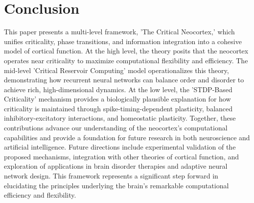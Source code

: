 \documentclass{article}
\begin{document}
\section{Conclusion}
This paper presents a multi-level framework, 'The Critical Neocortex,' which unifies criticality, phase transitions, and information integration into a cohesive model of cortical function. At the high level, the theory posits that the neocortex operates near criticality to maximize computational flexibility and efficiency. The mid-level 'Critical Reservoir Computing' model operationalizes this theory, demonstrating how recurrent neural networks can balance order and disorder to achieve rich, high-dimensional dynamics. At the low level, the 'STDP-Based Criticality' mechanism provides a biologically plausible explanation for how criticality is maintained through spike-timing-dependent plasticity, balanced inhibitory-excitatory interactions, and homeostatic plasticity. Together, these contributions advance our understanding of the neocortex's computational capabilities and provide a foundation for future research in both neuroscience and artificial intelligence. Future directions include experimental validation of the proposed mechanisms, integration with other theories of cortical function, and exploration of applications in brain disorder therapies and adaptive neural network design. This framework represents a significant step forward in elucidating the principles underlying the brain's remarkable computational efficiency and flexibility.
\end{document}
